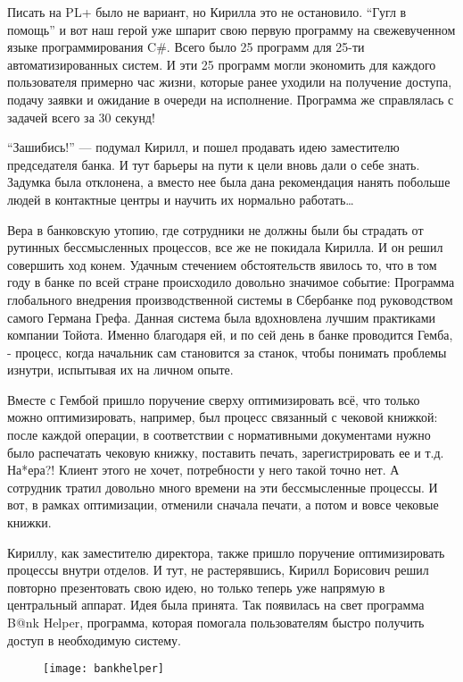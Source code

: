 \documentclass[../index.tex]{subfiles}
\begin{document}
Писать на PL+ было не вариант, но Кирилла это не остановило. “Гугл в помощь” и вот наш герой уже шпарит свою первую программу на свежевученном языке программирования C\#. Всего было 25 программ для 25-ти автоматизированных систем. И эти 25 программ могли экономить для каждого пользователя примерно час жизни, которые ранее уходили на получение доступа, подачу заявки и ожидание в очереди на исполнение. Программа же справлялась с задачей всего за 30 секунд! 


“Зашибись!” — подумал Кирилл, и пошел продавать идею заместителю председателя банка. И тут барьеры на пути к цели вновь дали о себе знать. Задумка была отклонена, а вместо нее была дана рекомендация нанять побольше людей в контактные центры и научить их нормально работать… 


Вера в банковскую утопию, где сотрудники не должны были бы страдать от рутинных бессмысленных процессов, все же не покидала Кирилла. И он решил совершить ход конем. Удачным стечением обстоятельств явилось то, что в том году в банке по всей стране происходило довольно значимое событие: Программа глобального внедрения производственной системы в Сбербанке под руководством самого Германа Грефа. Данная система была вдохновлена лучшим практиками компании Тойота. Именно благодаря ей, и по сей день в банке проводится Гемба, - процесс, когда начальник сам становится за станок, чтобы понимать проблемы изнутри, испытывая их на личном опыте.


Вместе с Гембой пришло поручение сверху оптимизировать всё, что только можно оптимизировать, например, был процесс связанный с чековой книжкой: после каждой операции, в соответствии с нормативными документами нужно было распечатать чековую книжку, поставить печать, зарегистрировать ее и т.д. На*ера?! Клиент этого не хочет, потребности у него такой точно нет. А сотрудник тратил довольно много времени на эти бессмысленные процессы.  И вот, в рамках оптимизации, отменили сначала печати, а потом и вовсе чековые книжки.


Кириллу, как заместителю директора, также пришло поручение оптимизировать процессы внутри отделов. И тут, не растерявшись, Кирилл Борисович решил повторно презентовать свою идею, но только теперь уже напрямую в центральный аппарат. Идея была принята. Так появилась на свет программа B@nk Helper, программа, которая помогала пользователям быстро получить доступ в необходимую систему. 

\begin{figure}[h]
\texttt{[image: bankhelper]}
\centering
\end{figure}
\end{document}
